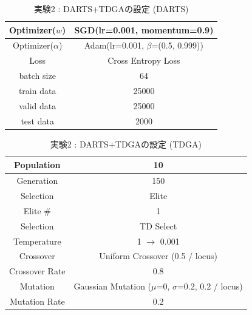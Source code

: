 \begin{table}[t]
  \begin{center}
    \caption{実験2 : DARTS+TDGAの設定 (DARTS)}
  	\vspace{3mm}
    \begin{tabular}{|c|c|} \hline
      Optimizer($w$) & SGD(lr=0.001, momentum=0.9) \\ \hline
      Optimizer($\alpha$) & Adam(lr=0.001, $\beta$=(0.5, 0.999)) \\ \hline
      Loss & Cross Entropy Loss \\ \hline
      batch size & 64 \\ \hline
      train data & 25000\\ \hline
      valid data & 25000\\ \hline
      test data &  2000\\ \hline
    \end{tabular}
    \label{tab:setting_darts}
  \end{center}
\end{table}

\begin{table}[t]
  \begin{center}
    \caption{実験2 : DARTS+TDGAの設定 (TDGA)}
  	\vspace{3mm}
    \begin{tabular}{|c|c|} \hline
      Population & 10 \\ \hline
      Generation & 150 \\ \hline \hline
      Selection & Elite \\ \hline
      Elite \# & 1 \\ \hline
      Selection & TD Select \\ \hline
      Temperature & 1 $\rightarrow$ 0.001 \\ \hline \hline
      Crossover & Uniform Crossover (0.5 / locus) \\ \hline
      Crossover Rate & 0.8 \\ \hline \hline
      Mutation & Gaussian Mutation ($\mu$=0, $\sigma$=0.2, 0.2 / locus)\\ \hline
      Mutation Rate & 0.2 \\ \hline
    \end{tabular}
    \label{tab:setting_ga}
  \end{center}
\end{table}

